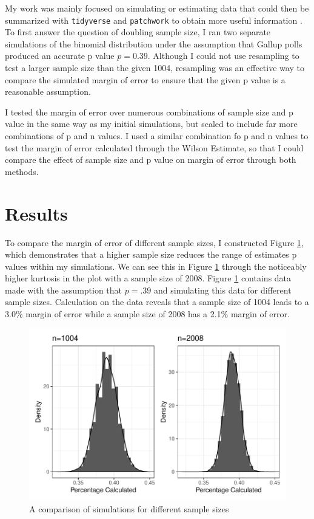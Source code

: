 \documentclass{article}\usepackage[]{graphicx}\usepackage[]{xcolor}
\begin{document}
\begin{multicols}{2}
My work was mainly focused on simulating or estimating data that could then be summarized with \texttt{tidyverse} and \texttt{patchwork} to obtain more useful information \citep{tidyverse,  patchwork}. To first answer the question of doubling sample size, I ran two separate simulations of the binomial distribution under the assumption that Gallup polls produced an accurate p value $p=0.39$. Although I could not use resampling to test a larger sample size than the given 1004, resampling was an effective way to compare the simulated margin of error to ensure that the given p value is a reasonable assumption. 

I tested the margin of error over numerous combinations of sample size and p value in the same way as my initial simulations, but scaled to include far more combinations of p and n values. I used a similar combination fo p and n values to test the margin of error calculated through the Wilson Estimate, so that I could compare the effect of sample size and p value on margin of error through both methods.

\section{Results}

To compare the margin of error of different sample sizes, I constructed Figure \ref{plot1}, which demonstrates that a higher sample size reduces the range of estimates p values within my simulations. We can see this in Figure \ref{plot1} through the noticeably higher kurtosis in the plot with a sample size of 2008. Figure \ref{plot1} contains data made with the assumption that $p=.39$ and simulating this data for different sample sizes. Calculation on the data reveals that a sample size of 1004 leads to a 3.0\% margin of error while a sample size of 2008 has a 2.1\% margin of error. 

\begin{figure}[H]
 \begin{center}
 \includegraphics[scale=0.65]{part1_comparison.pdf}
 \caption{A comparison of simulations for different sample sizes}
 \label{plot1}
 \end{center}
 \end{figure}


\end{multicols}
\end{document}
